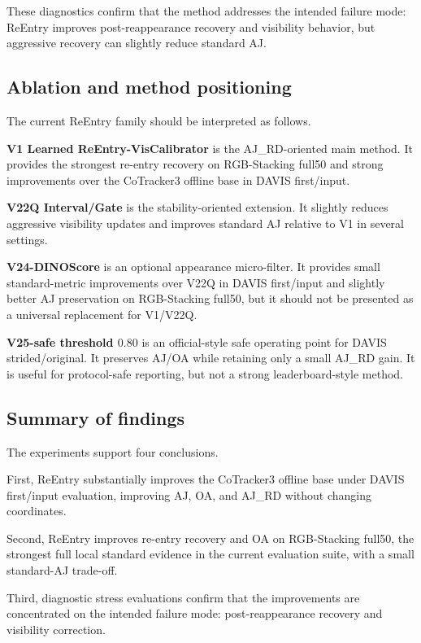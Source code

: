 These diagnostics confirm that the method addresses the intended failure mode: ReEntry improves post-reappearance recovery and visibility behavior, but aggressive recovery can slightly reduce standard AJ.

\subsection{Ablation and method positioning}
\label{sec:method_positioning}

The current ReEntry family should be interpreted as follows.

\textbf{V1 Learned ReEntry-VisCalibrator} is the AJ\_RD-oriented main method. It provides the strongest re-entry recovery on RGB-Stacking full50 and strong improvements over the CoTracker3 offline base in DAVIS first/input.

\textbf{V22Q Interval/Gate} is the stability-oriented extension. It slightly reduces aggressive visibility updates and improves standard AJ relative to V1 in several settings.

\textbf{V24-DINOScore} is an optional appearance micro-filter. It provides small standard-metric improvements over V22Q in DAVIS first/input and slightly better AJ preservation on RGB-Stacking full50, but it should not be presented as a universal replacement for V1/V22Q.

\textbf{V25-safe threshold $0.80$} is an official-style safe operating point for DAVIS strided/original. It preserves AJ/OA while retaining only a small AJ\_RD gain. It is useful for protocol-safe reporting, but not a strong leaderboard-style method.

\subsection{Summary of findings}
\label{sec:results_summary}

The experiments support four conclusions.

First, ReEntry substantially improves the CoTracker3 offline base under DAVIS first/input evaluation, improving AJ, OA, and AJ\_RD without changing coordinates.

Second, ReEntry improves re-entry recovery and OA on RGB-Stacking full50, the strongest full local standard evidence in the current evaluation suite, with a small standard-AJ trade-off.

Third, diagnostic stress evaluations confirm that the improvements are concentrated on the intended failure mode: post-reappearance recovery and visibility correction.

